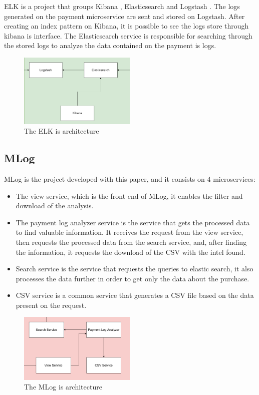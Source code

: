 ELK \cite{elk} is a project that groups Kibana \cite{kibana}, Elasticsearch \cite{elasticsearch} and Logstash \cite{logstash}. The logs generated on the payment microservice are sent and stored on Logstash. After creating an index pattern on Kibana, it is possible to see the logs store through kibana is interface. The Elasticsearch service is responsible for searching through the stored logs to analyze the data contained on the payment is logs.

\begin{figure}[htbp]
\centering
\centerline{\includegraphics[width=0.5\textwidth]{Media/elk.png}}
\caption{The ELK is architecture}
\label{fig:architecture-elk}
\end{figure}

\subsection{MLog}

MLog \cite{mlog} is the project developed with this paper, and it consists on 4 microservices:

\begin{itemize}
  \item The view service, which is the front-end of MLog, it enables the filter and download of the analysis.
  \item The payment log analyzer service is the service that gets the processed data to find valuable information. It receives the request from the view service, then requests the processed data from the search service, and, after finding the information, it requests the download of the CSV with the intel found.
  \item Search service is the service that requests the queries to elastic search, it also processes the data further in order to get only the data about the purchase.
  \item CSV service is a common service that generates a CSV file based on the data present on the request.
\end{itemize}

\begin{figure}[htbp]
\centering
\centerline{\includegraphics[width=0.5\textwidth]{Media/mlog.png}}
\caption{The MLog is architecture}
\label{fig:architecture-mlog}
\end{figure}